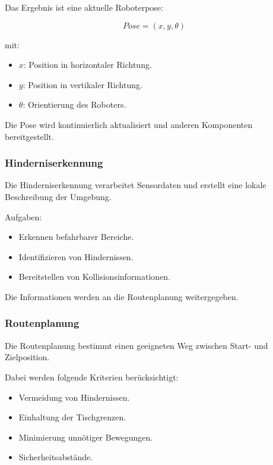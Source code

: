 \documentclass[
  a4paper,
  12pt,
  DIV=12,        %
  parskip=half,  %
  headings=small %
]{scrartcl}
\theoremstyle{definition}
\providecommand{\tightlist}{%
  \setlength{\itemsep}{0pt}\setlength{\parskip}{0pt}}
\theoremstyle{definition}
\begin{document}
Das Ergebnis ist eine aktuelle Roboterpose:

\[
Pose = (x, y, \theta)
\]

mit:

\begin{itemize}
\tightlist
\item
  \(x\): Position in horizontaler Richtung.
\item
  \(y\): Position in vertikaler Richtung.
\item
  \(\theta\): Orientierung des Roboters.
\end{itemize}

Die Pose wird kontinuierlich aktualisiert und anderen Komponenten
bereitgestellt.

\subsubsection{Hinderniserkennung}\label{hinderniserkennung-1}

Die Hinderniserkennung verarbeitet Sensordaten und erstellt eine lokale
Beschreibung der Umgebung.

Aufgaben:

\begin{itemize}
\tightlist
\item
  Erkennen befahrbarer Bereiche.
\item
  Identifizieren von Hindernissen.
\item
  Bereitstellen von Kollisionsinformationen.
\end{itemize}

Die Informationen werden an die Routenplanung weitergegeben.

\subsubsection{Routenplanung}\label{routenplanung}

Die Routenplanung bestimmt einen geeigneten Weg zwischen Start- und
Zielposition.

Dabei werden folgende Kriterien berücksichtigt:

\begin{itemize}
\tightlist
\item
  Vermeidung von Hindernissen.
\item
  Einhaltung der Tischgrenzen.
\item
  Minimierung unnötiger Bewegungen.
\item
  Sicherheitsabstände.
\end{itemize}
\end{document}
